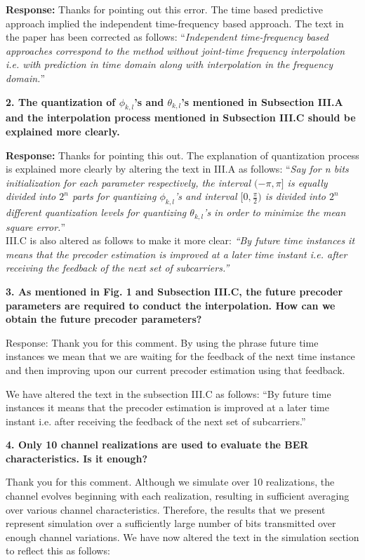 \documentclass[12pt]{letter}
\begin{document}
\textbf{Response:} Thanks for pointing out this error. The time based predictive approach implied the independent time-frequency based approach. The text in the paper has been corrected as follows: 
``\emph{Independent time-frequency based approaches correspond to the method without joint-time frequency interpolation i.e. with prediction in time domain along with interpolation in the frequency domain.}''

\textbf{2. The quantization of $\phi_{k,l}$'s and $\theta_{k,l}$'s mentioned in Subsection III.A and the interpolation
process mentioned in Subsection III.C should be explained more clearly.}

\textbf{Response:} 
Thanks for pointing this out. The explanation of quantization process is explained more clearly by altering the text in III.A as follows: ``\emph{Say for n bits initialization for each parameter respectively, the interval $(-\pi,\pi]$ 
is equally divided into $2^n$ parts for quantizing $\phi_{k,l}$'s and interval $[0,\frac{\pi}{2})$
is divided into $2^n$ different quantization levels for quantizing $\theta_{k,l}$'s in order to minimize
the mean square error.}''\\
III.C is also altered as follows to make it more clear:
\emph{``By future time instances it means that
the precoder estimation is improved at a later time instant i.e.
after receiving the feedback of the next set of subcarriers.''}

\textbf{3. As mentioned in Fig. 1 and Subsection III.C, the future precoder parameters are required to conduct the interpolation. How can we obtain the future precoder parameters?}

Response: Thank you for this comment. By using the phrase future time instances we mean 
that we are waiting for the feedback of the next time instance and then improving upon our current 
precoder estimation using that feedback. 

We have altered the text in the subsection III.C as follows: 
``By future time instances it means that the precoder estimation is improved 
at a later time instant i.e. after receiving the feedback of the next set of
subcarriers.''

\textbf{4. Only 10 channel realizations are used to evaluate the BER characteristics. Is it enough?}

Thank you for this comment. Although we simulate over 10 realizations, the channel evolves beginning with each realization, resulting in sufficient averaging over various channel characteristics. Therefore, the results that we present represent simulation over a sufficiently large number of bits transmitted over enough channel variations. We have now altered the text in the simulation section to reflect this as follows:
\end{document}
